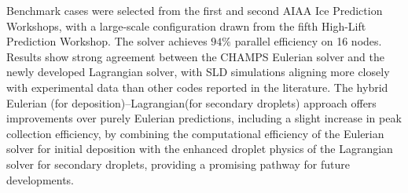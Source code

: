 Benchmark cases were selected from the first and second AIAA Ice Prediction Workshops, with a large-scale configuration drawn from the fifth High-Lift Prediction Workshop. The solver achieves $94\%$ parallel efficiency on 16 nodes. Results show strong agreement between the CHAMPS Eulerian solver and the newly developed Lagrangian solver, with SLD simulations aligning more closely with experimental data than other codes reported in the literature. The hybrid Eulerian (for deposition)–Lagrangian(for secondary droplets) approach offers improvements over purely Eulerian predictions, including a slight increase in peak collection efficiency,  by combining the computational efficiency of the Eulerian solver for initial deposition with the enhanced droplet physics of the Lagrangian solver for secondary droplets, providing a promising pathway for future developments.
